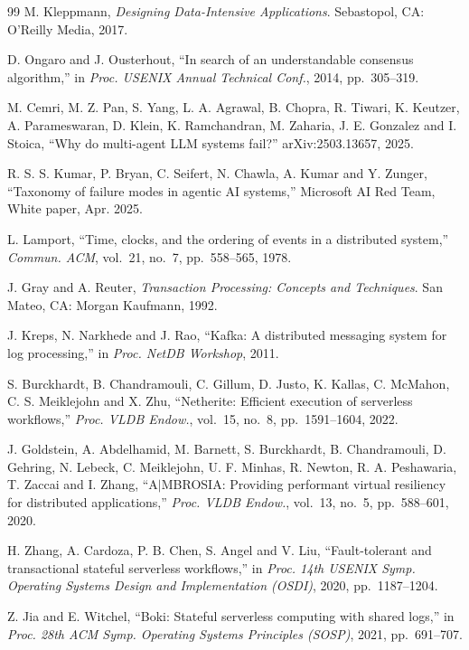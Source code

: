 \begin{singlespace}
\begin{thebibliography}{99}
M. Kleppmann, \emph{Designing Data-Intensive Applications}. Sebastopol, CA:
O'Reilly Media, 2017.

D. Ongaro and J. Ousterhout, ``In search of an understandable consensus
algorithm,'' in \emph{Proc. USENIX Annual Technical Conf.}, 2014,
pp.~305--319.

M. Cemri, M. Z. Pan, S. Yang, L. A. Agrawal, B. Chopra, R. Tiwari, K. Keutzer,
A. Parameswaran, D. Klein, K. Ramchandran, M. Zaharia, J. E. Gonzalez and
I. Stoica, ``Why do multi-agent LLM systems fail?'' arXiv:2503.13657, 2025.

R. S. S. Kumar, P. Bryan, C. Seifert, N. Chawla, A. Kumar and Y. Zunger,
``Taxonomy of failure modes in agentic AI systems,'' Microsoft AI Red Team,
White paper, Apr. 2025.

L. Lamport, ``Time, clocks, and the ordering of events in a distributed
system,'' \emph{Commun. ACM}, vol.~21, no.~7, pp.~558--565, 1978.

J. Gray and A. Reuter, \emph{Transaction Processing: Concepts and Techniques}.
San Mateo, CA: Morgan Kaufmann, 1992.

J. Kreps, N. Narkhede and J. Rao, ``Kafka: A distributed messaging system for
log processing,'' in \emph{Proc. NetDB Workshop}, 2011.

S. Burckhardt, B. Chandramouli, C. Gillum, D. Justo, K. Kallas, C. McMahon,
C. S. Meiklejohn and X. Zhu, ``Netherite: Efficient execution of serverless
workflows,'' \emph{Proc. VLDB Endow.}, vol.~15, no.~8, pp.~1591--1604, 2022.

J. Goldstein, A. Abdelhamid, M. Barnett, S. Burckhardt, B. Chandramouli,
D. Gehring, N. Lebeck, C. Meiklejohn, U. F. Minhas, R. Newton,
R. A. Peshawaria, T. Zaccai and I. Zhang, ``A$\mid$MBROSIA: Providing
performant virtual resiliency for distributed applications,'' \emph{Proc. VLDB
Endow.}, vol.~13, no.~5, pp.~588--601, 2020.

H. Zhang, A. Cardoza, P. B. Chen, S. Angel and V. Liu, ``Fault-tolerant and
transactional stateful serverless workflows,'' in \emph{Proc. 14th USENIX
Symp. Operating Systems Design and Implementation (OSDI)}, 2020,
pp.~1187--1204.

Z. Jia and E. Witchel, ``Boki: Stateful serverless computing with shared
logs,'' in \emph{Proc. 28th ACM Symp. Operating Systems Principles (SOSP)},
2021, pp.~691--707.


\end{thebibliography}
\end{singlespace}
